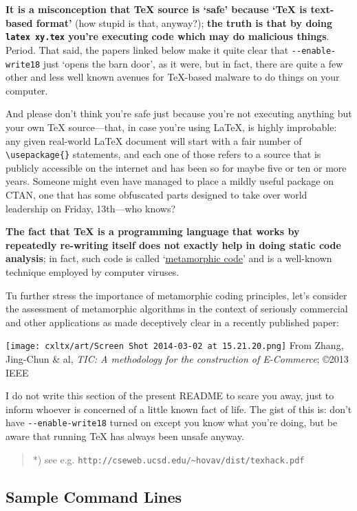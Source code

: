 \textbf{It is a misconception that TeX source is `safe' because `TeX is
text-based format'} (how stupid is that, anyway?); \textbf{the truth is
that by doing \texttt{latex xy.tex} you're executing code which may do
malicious things}. Period. That said, the papers linked below make it
quite clear that \texttt{-{}-enable-write18} just `opens the barn door',
as it were, but in fact, there are quite a few other and less well known
avenues for TeX-based malware to do things on your computer.

And please don't think you're safe just because you're not executing
anything but your own TeX source---that, in case you're using LaTeX, is
highly improbable: any given real-world LaTeX document will start with a
fair number of \texttt{\textbackslash{}usepackage\{\}} statements, and
each one of those refers to a source that is publicly accessible on the
internet and has been so for maybe five or ten or more years. Someone
might even have managed to place a mildly useful package on CTAN, one
that has some obfuscated parts designed to take over world leadership on
Friday, 13th---who knows?

\textbf{The fact that TeX is a programming language that works by
repeatedly re-writing itself does not exactly help in doing static code
analysis}; in fact, such code is called
`\href{http://en.wikipedia.org/wiki/Metamorphic_code}{metamorphic code}'
and is a well-known technique employed by computer viruses.

Tu further stress the importance of metamorphic coding principles, let's
consider the assessment of metamorphic algorithms in the context of
seriously commercial and other applications as made deceptively clear in
a recently published paper:

\texttt{[image: cxltx/art/Screen Shot 2014-03-02 at 15.21.20.png]} From
Zhang, Jing-Chun \& al, \emph{TIC: A methodology for the construction of
E-Commerce}; ©2013 IEEE

I do not write this section of the present README to scare you away,
just to inform whoever is concerned of a little known fact of life. The
gist of this is: don't have \texttt{-{}-enable-write18} turned on except
you know what you're doing, but be aware that running TeX has always
been unsafe anyway.

\begin{quote}
*) see e.g.
\texttt{http://cseweb.ucsd.edu/\textasciitilde{}hovav/dist/texhack.pdf}
\end{quote}

\subsection{Sample Command Lines}\label{sample-command-lines}

